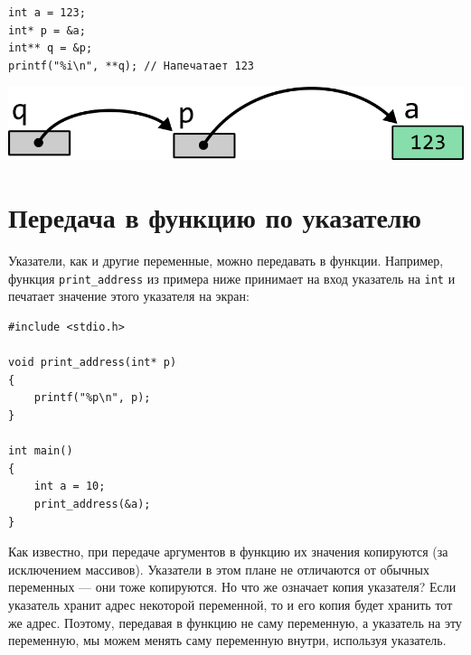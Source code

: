 \documentclass[10pt]{article}
\begin{document}
\begin{itemize}
\begin{minipage}{0.5\linewidth}
\begin{lstlisting}
int a = 123;
int* p = &a;
int** q = &p;
printf("%i\n", **q); // Напечатает 123
\end{lstlisting}
\end{minipage}
\begin{minipage}{0.45\linewidth}
\begin{center}
\includegraphics[scale=1]{../images/pointer_tasks/pointer_tasks_pointer_to_pointer.png}
\end{center}
\end{minipage}

\end{itemize}



\newpage
\section*{Передача в функцию по указателю}
Указатели, как и другие переменные, можно передавать в функции.
Например, функция \texttt{print\_address} из примера ниже принимает на вход указатель на \texttt{int} и печатает значение этого указателя на экран:
\begin{lstlisting}
#include <stdio.h>

void print_address(int* p)
{
    printf("%p\n", p);
}

int main()
{
    int a = 10;
    print_address(&a);
}
\end{lstlisting}
Как известно, при передаче аргументов в функцию их значения копируются (за исключением массивов). Указатели в этом плане не отличаются от обычных переменных — они тоже копируются. Но что же означает копия указателя? Если указатель хранит адрес некоторой переменной, то и его копия будет хранить тот же адрес. Поэтому, передавая в функцию не саму переменную, а указатель на эту переменную, мы можем менять саму переменную внутри, используя указатель.
\end{document}
